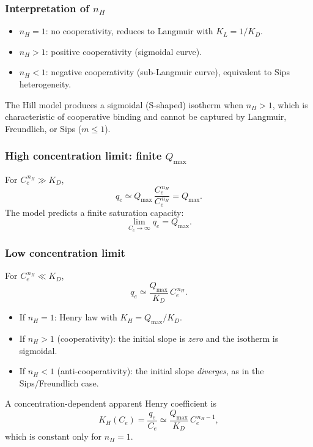 	\subsubsection{Interpretation of $n_H$}

	\begin{itemize}
		\item $n_H = 1$: no cooperativity, reduces to Langmuir
		with $K_L = 1/K_D$.
		\item $n_H > 1$: positive cooperativity (sigmoidal curve).
		\item $n_H < 1$: negative cooperativity (sub-Langmuir
		curve), equivalent to Sips heterogeneity.
	\end{itemize}
	The Hill model produces a sigmoidal (S-shaped) isotherm when
	$n_H > 1$, which is characteristic of cooperative binding and
	cannot be captured by Langmuir, Freundlich, or Sips ($m \leq 1$).

	\subsubsection{High concentration limit: finite $Q_{\max}$}

	For $C_e^{\,n_H} \gg K_D$,
	\begin{equation}
		q_e \simeq Q_{\max}\,\frac{C_e^{\,n_H}}{C_e^{\,n_H}} = Q_{\max}.
	\end{equation}
	The model predicts a finite saturation capacity:
	\begin{equation}
		\boxed{\lim_{C_e \to \infty} q_e = Q_{\max}.}
	\end{equation}

	\subsubsection{Low concentration limit}

	For $C_e^{\,n_H} \ll K_D$,
	\begin{equation}
		q_e \simeq \frac{Q_{\max}}{K_D}\, C_e^{\,n_H}.
	\end{equation}
	\begin{itemize}
		\item If $n_H = 1$: Henry law with $K_H = Q_{\max}/K_D$.
		\item If $n_H > 1$ (cooperativity): the initial slope is
		\emph{zero} and the isotherm is sigmoidal.
		\item If $n_H < 1$ (anti-cooperativity): the initial slope
		\emph{diverges}, as in the Sips/Freundlich case.
	\end{itemize}
	A concentration-dependent apparent Henry coefficient is
	\begin{equation}
		K_H(C_e)
		= \frac{q_e}{C_e}
		\simeq \frac{Q_{\max}}{K_D}\, C_e^{\,n_H - 1},
	\end{equation}
	which is constant only for $n_H = 1$.


